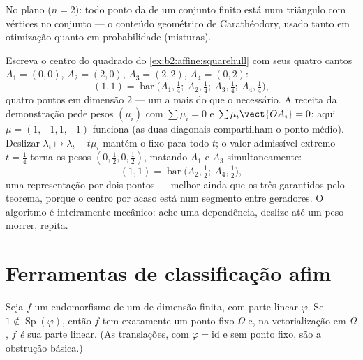 \begin{example}
No plano ($n = 2$): todo ponto da  de um conjunto
finito está num triângulo com vértices no conjunto --- o conteúdo
geométrico de Carathéodory, usado tanto em otimização quanto em probabilidade
(misturas).
\end{example}

\begin{example}\label{ex:b2:affine:caratheodoryrun}
Escreva o centro do quadrado do
\cref{ex:b2:affine:squarehull} com seus quatro cantos $A_1 =
(0,0)$, $A_2 = (2,0)$, $A_3 = (2,2)$, $A_4 = (0,2)$:
\[
(1,1) = \operatorname{bar}\bigl(A_1, \tfrac14;\ A_2,
\tfrac14;\ A_3, \tfrac14;\ A_4, \tfrac14\bigr),
\]
quatro pontos em dimensão $2$ --- um a mais do que o necessário. A
receita da demonstração pede pesos $(\mu_i)$ com $\sum\mu_i = 0$ e
$\sum\mu_i\vect{OA_i} = 0$: aqui $\mu = (1, -1, 1, -1)$ funciona
(as duas diagonais compartilham o ponto médio). Deslizar $\lambda_i
\mapsto \lambda_i - t\mu_i$ mantém o  fixo para
todo $t$; o valor admissível extremo $t = \frac14$ torna
os pesos $(0, \tfrac12, 0, \tfrac12)$, matando $A_1$ e
$A_3$ simultaneamente:
\[
(1,1) = \operatorname{bar}\bigl(A_2, \tfrac12;\ A_4,
\tfrac12\bigr),
\]
uma representação por dois pontos --- melhor ainda que os três
garantidos pelo teorema, porque o centro por acaso
está num segmento entre geradores. O algoritmo é
inteiramente mecânico: ache uma dependência, deslize até um peso
morrer, repita.
\end{example}

\section{Ferramentas de classificação afim}

\begin{proposition}\label{prop:b2:affine:fixedpoint}
Seja $f$ um endomorfismo  de um  de dimensão
finita, com parte linear $\varphi$. Se $1 \notin
\operatorname{Sp}(\varphi)$, então $f$ tem exatamente um ponto fixo
$\Omega$ e, na vetorialização em $\Omega$, $f$ \emph{é}
sua parte linear. (As translações, com $\varphi = \mathrm{id}$ e sem
ponto fixo, são a obstrução básica.)
\end{proposition}


